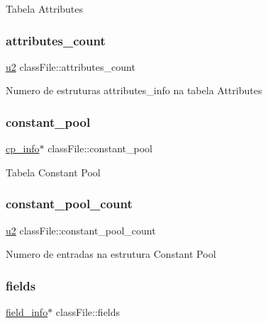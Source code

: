 Tabela Attributes \mbox{\label{structclassFile_a9c2f1bdfe0c43e7189f2a7100bec1966}} 
\subsubsection{\texorpdfstring{attributes\+\_\+count}{attributes\_count}}
{\footnotesize\ttfamily \hyperlink{lista__operandos_8h_a732cde1300aafb73b0ea6c2558a7a54f}{u2} class\+File\+::attributes\+\_\+count}

Numero de estruturas attributes\+\_\+info na tabela Attributes \mbox{\label{structclassFile_adb70ba83c3ffbcc26bffaff8185be813}} 
\subsubsection{\texorpdfstring{constant\+\_\+pool}{constant\_pool}}
{\footnotesize\ttfamily \hyperlink{structcp__info}{cp\+\_\+info}$\ast$ class\+File\+::constant\+\_\+pool}

Tabela Constant Pool \mbox{\label{structclassFile_ac8f5b297483f2b3e9f02ff133f248b40}} 
\subsubsection{\texorpdfstring{constant\+\_\+pool\+\_\+count}{constant\_pool\_count}}
{\footnotesize\ttfamily \hyperlink{lista__operandos_8h_a732cde1300aafb73b0ea6c2558a7a54f}{u2} class\+File\+::constant\+\_\+pool\+\_\+count}

Numero de entradas na estrutura Constant Pool \mbox{\label{structclassFile_af08165230270046ef4f4dcc6fb8133ae}} 
\subsubsection{\texorpdfstring{fields}{fields}}
{\footnotesize\ttfamily \hyperlink{structfield__info}{field\+\_\+info}$\ast$ class\+File\+::fields}

